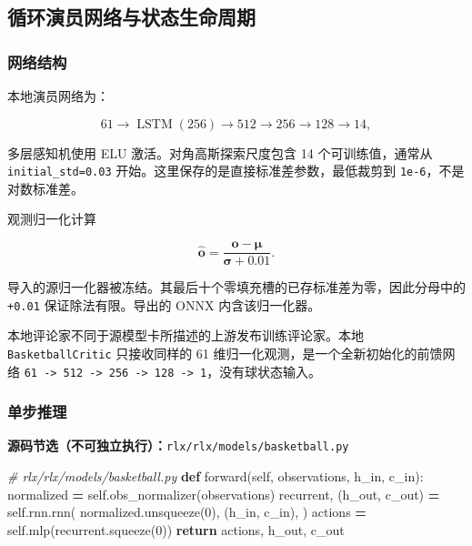 \documentclass[
  chinese,
  11pt,
  letterpaper,
]{article}
\newenvironment{Shaded}{\begin{snugshade}}{\end{snugshade}}
\newcommand{\CommentTok}[1]{\textcolor[rgb]{0.56,0.35,0.01}{\textit{#1}}}
\newcommand{\ControlFlowTok}[1]{\textcolor[rgb]{0.13,0.29,0.53}{\textbf{#1}}}
\newcommand{\DecValTok}[1]{\textcolor[rgb]{0.00,0.00,0.81}{#1}}
\newcommand{\KeywordTok}[1]{\textcolor[rgb]{0.13,0.29,0.53}{\textbf{#1}}}
\newcommand{\NormalTok}[1]{#1}
\newcommand{\OperatorTok}[1]{\textcolor[rgb]{0.81,0.36,0.00}{\textbf{#1}}}
\newcommand{\VariableTok}[1]{\textcolor[rgb]{0.00,0.00,0.00}{#1}}
\renewenvironment{Shaded}{\par\smallskip}{\par\smallskip}
\begin{document}
\subsection{循环演员网络与状态生命周期}\label{ux5faaux73afux6f14ux5458ux7f51ux7edcux4e0eux72b6ux6001ux751fux547dux5468ux671f}

\subsubsection{网络结构}\label{ux7f51ux7edcux7ed3ux6784}

本地演员网络为：

\[
61
\rightarrow \operatorname{LSTM}(256)
\rightarrow 512
\rightarrow 256
\rightarrow 128
\rightarrow 14,
\]

多层感知机使用 ELU 激活。对角高斯探索尺度包含 14 个可训练值，通常从
\texttt{initial\_std=0.03} 开始。这里保存的是直接标准差参数，最低裁剪到
\texttt{1e-6}，不是对数标准差。

观测归一化计算

\[
\widehat{\mathbf o}
=\frac{\mathbf o-\boldsymbol\mu}
{\boldsymbol\sigma+0.01}.
\]

导入的源归一化器被冻结。其最后十个零填充槽的已存标准差为零，因此分母中的
\texttt{+0.01} 保证除法有限。导出的 ONNX 内含该归一化器。

本地评论家不同于源模型卡所描述的上游发布训练评论家。本地
\texttt{Basketba\allowbreak{}llCritic\allowbreak{}} 只接收同样的 61
维归一化观测，是一个全新初始化的前馈网络
\texttt{61\ -\textgreater{}\ 512\ -\textgreater{}\ 256\ -\textgreater{}\ 128\ -\textgreater{}\ 1}，没有球状态输入。

\subsubsection{单步推理}\label{ux5355ux6b65ux63a8ux7406}

\textbf{源码节选（不可独立执行）：}\texttt{rlx/\allowbreak{}rlx/\allowbreak{}models/\allowbreak{}basketba\allowbreak{}ll.py}

\begin{Shaded}
\begin{Highlighting}[]
\CommentTok{\# rlx/rlx/models/basketball.py}
\KeywordTok{def}\NormalTok{ forward(}\VariableTok{self}\NormalTok{, observations, h\_in, c\_in):}
\NormalTok{    normalized }\OperatorTok{=} \VariableTok{self}\NormalTok{.obs\_normalizer(observations)}
\NormalTok{    recurrent, (h\_out, c\_out) }\OperatorTok{=} \VariableTok{self}\NormalTok{.rnn.rnn(}
\NormalTok{        normalized.unsqueeze(}\DecValTok{0}\NormalTok{),}
\NormalTok{        (h\_in, c\_in),}
\NormalTok{    )}
\NormalTok{    actions }\OperatorTok{=} \VariableTok{self}\NormalTok{.mlp(recurrent.squeeze(}\DecValTok{0}\NormalTok{))}
    \ControlFlowTok{return}\NormalTok{ actions, h\_out, c\_out}
\end{Highlighting}
\end{Shaded}
\end{document}
